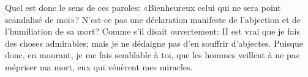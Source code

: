 Quel est donc le sens de ces paroles:
	«Bienheureux celui qui ne sera point scandalisé de moi»?
N’est-ce pas une déclaration manifeste
	de l’abjection et de l’humiliation de sa mort?
Comme s’il disait ouvertement:
	II est vrai que je fais des choses admirables;
	mais je ne dédaigne pas d’en souffrir d’abjectes.
Puisque donc, en mourant, je me fais semblable à toi,
	que les hommes veillent à ne pas mépriser ma mort,
	eux qui vénèrent mes miracles.
